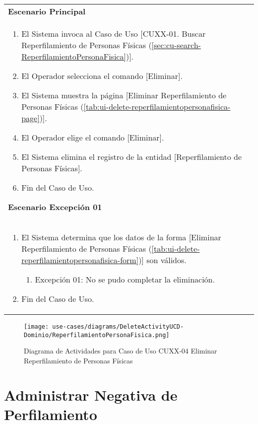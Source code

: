	\begin{tabular}{ p{15.5cm} }
		\textbf{Escenario Principal} \\
		\begin{enumerate}
			\item El Sistema invoca al Caso de Uso [CUXX-01. Buscar Reperfilamiento de Personas F\'isicas (\ref{sec:cu-search-ReperfilamientoPersonaFisica})].
			\item El Operador selecciona el comando [Eliminar].
			\item El Sistema muestra la p\'agina [Eliminar Reperfilamiento de Personas F\'isicas (\ref{tab:ui-delete-reperfilamientopersonafisica-page})].
			\item El Operador elige el comando [Eliminar].
			\item El Sistema elimina el registro de la entidad [Reperfilamiento de Personas F\'isicas].
			\item Fin del Caso de Uso.
		\end{enumerate}
		\textbf{Escenario Excepci\'on 01} \\
		\begin{enumerate}
		   \item El Sistema determina que los datos de la forma [Eliminar Reperfilamiento de Personas F\'isicas (\ref{tab:ui-delete-reperfilamientopersonafisica-form})] son v\'alidos.
		   	\begin{enumerate}
		   		\item Excepci\'on 01: No se pudo completar la eliminaci\'on.
		    \end{enumerate}
		   \item Fin del Caso de Uso.
		\end{enumerate}
	\end{tabular}
	
	\begin{figure}[H]
	  \begin{center}
		 \label{tab:activity-delete-ucd-entity-reperfilamientopersonafisica}
		 \texttt{[image: use-cases/diagrams/DeleteActivityUCD-Dominio/ReperfilamientoPersonaFisica.png]}
		 \caption{Diagrama de Actividades para Caso de Uso CUXX-04 Eliminar Reperfilamiento de Personas F\'isicas}
	  \end{center}
	\end{figure}
	
	\clearpage
	\section{Administrar Negativa de Perfilamiento} \label{sec:cf-uc-admin-negativaperfilamiento}
	
